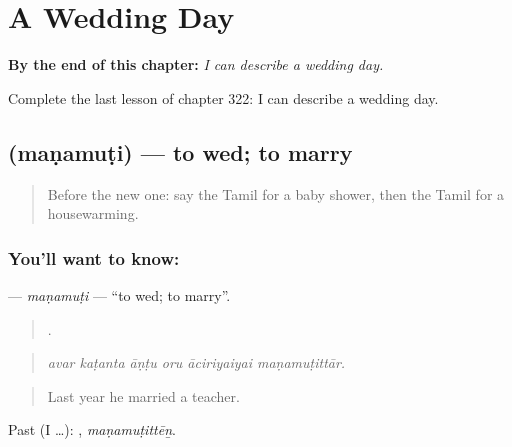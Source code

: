 
\chapter{A Wedding Day}
\label{ch:ta-a-wedding-day}

\begin{chapteropening}
\textbf{By the end of this chapter:} \emph{I can describe a wedding day.}

Complete the last lesson of chapter 322: I can describe a wedding day.
\end{chapteropening}

\section[\texorpdfstring{\ta{மணமுடி} (maṇamuṭi)}{மணமுடி (maṇamuṭi)}]{ (maṇamuṭi) — to wed; to marry}

\label{lesson:TA-C322-manamuti}



\begin{quote}
Before the new one: say the Tamil for a baby shower, then the Tamil for a housewarming.
\end{quote}

\subsection*{You'll want to know: }
\textbf{} — \emph{maṇamuṭi} — \textquotedblleft{}to wed; to marry\textquotedblright{}.

\begin{quote}
     .
\end{quote}

\begin{quote}
\emph{avar kaṭanta āṇṭu oru āciriyaiyai maṇamuṭittār.}
\end{quote}

\begin{quote}
Last year he married a teacher.
\end{quote}

Past (I …): , \emph{maṇamuṭittēṉ}.

